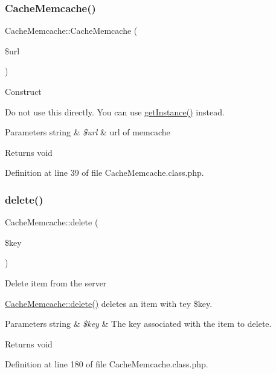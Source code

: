 \subsubsection{\texorpdfstring{Cache\+Memcache()}{CacheMemcache()}}
{\footnotesize\ttfamily Cache\+Memcache\+::\+Cache\+Memcache (\begin{DoxyParamCaption}\item[{}]{\$url }\end{DoxyParamCaption})}

Construct

Do not use this directly. You can use \hyperlink{classCacheMemcache_a951aa78ba49fdb971def3e2bb8b7db2e}{get\+Instance()} instead. 
\begin{DoxyParams}[1]{Parameters}
string & {\em \$url} & url of memcache \\
\hline
\end{DoxyParams}
\begin{DoxyReturn}{Returns}
void 
\end{DoxyReturn}


Definition at line 39 of file Cache\+Memcache.\+class.\+php.

\mbox{\label{classCacheMemcache_aca057fd092e1a938410a20e16d2d2d7f}} 
\subsubsection{\texorpdfstring{delete()}{delete()}}
{\footnotesize\ttfamily Cache\+Memcache\+::delete (\begin{DoxyParamCaption}\item[{}]{\$key }\end{DoxyParamCaption})}

Delete item from the server

\hyperlink{classCacheMemcache_aca057fd092e1a938410a20e16d2d2d7f}{Cache\+Memcache\+::delete()} deletes an item with tey \$key.


\begin{DoxyParams}[1]{Parameters}
string & {\em \$key} & The key associated with the item to delete. \\
\hline
\end{DoxyParams}
\begin{DoxyReturn}{Returns}
void 
\end{DoxyReturn}


Definition at line 180 of file Cache\+Memcache.\+class.\+php.

